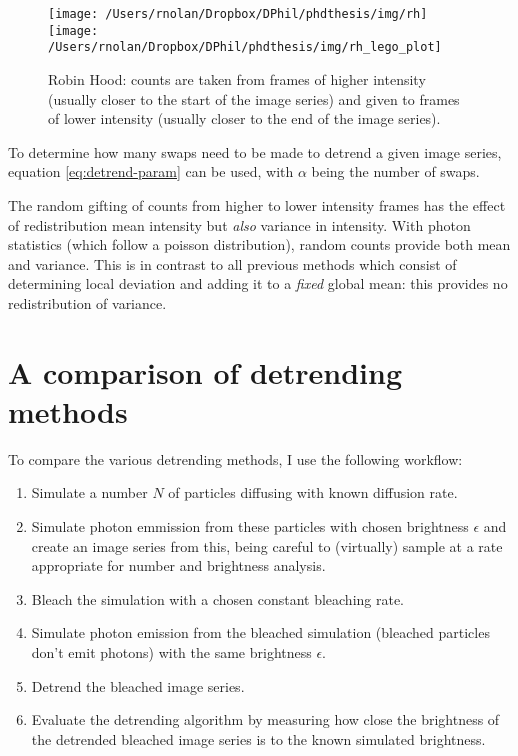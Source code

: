 \documentclass[12pt,]{book}
\providecommand{\tightlist}{%
  \setlength{\itemsep}{0pt}\setlength{\parskip}{0pt}}
\theoremstyle{definition}
\theoremstyle{definition}
\theoremstyle{definition}
\theoremstyle{remark}
\begin{document}
\begin{figure}

\texttt{[image: /Users/rnolan/Dropbox/DPhil/phdthesis/img/rh]} \texttt{[image: /Users/rnolan/Dropbox/DPhil/phdthesis/img/rh\_lego\_plot]} \hfill{}

\caption{Robin Hood: counts are taken from frames of higher
intensity (usually closer to the start of the image series) and given to
frames of lower intensity (usually closer to the end of the image
series).}\label{fig:rh-lego}
\end{figure}

To determine how many swaps need to be made to detrend a given image
series, equation \eqref{eq:detrend-param} can be used, with \(\alpha\)
being the number of swaps.

The random gifting of counts from higher to lower intensity frames has
the effect of redistribution mean intensity but \emph{also} variance in
intensity. With photon statistics (which follow a poisson distribution),
random counts provide both mean and variance. This is in contrast to all
previous methods which consist of determining local deviation and adding
it to a \emph{fixed} global mean: this provides no redistribution of
variance.

\section{A comparison of detrending
methods}\label{a-comparison-of-detrending-methods}

To compare the various detrending methods, I use the following workflow:

\begin{enumerate}
\def\labelenumi{\arabic{enumi}.}
\tightlist
\item
  Simulate a number \(N\) of particles diffusing with known diffusion
  rate.
\item
  Simulate photon emmission from these particles with chosen brightness
  \(\epsilon\) and create an image series from this, being careful to
  (virtually) sample at a rate appropriate for number and brightness
  analysis.
\item
  Bleach the simulation with a chosen constant bleaching rate.
\item
  Simulate photon emission from the bleached simulation (bleached
  particles don't emit photons) with the same brightness \(\epsilon\).
\item
  Detrend the bleached image series.
\item
  Evaluate the detrending algorithm by measuring how close the
  brightness of the detrended bleached image series is to the known
  simulated brightness.
\end{enumerate}
\end{document}
